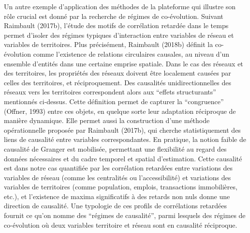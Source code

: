 \documentclass[10pt]{article}
\begin{document}
Un autre exemple d’application des méthodes de la plateforme qui illustre son rôle crucial est donné par la recherche de régimes de co-évolution. Suivant Raimbault (2017b), l'étude des motifs de corrélation retardée dans le temps permet d’isoler des régimes typiques d’interaction entre variables de réseau et variables de territoires. Plus précisément, Raimbault (2018b) définit la co-évolution comme l’existence de relations circulaires causales, au niveau d’un ensemble d’entités dans une certaine emprise spatiale. Dans le cas des réseaux et des territoires, les propriétés des réseaux doivent être localement causées par celles des territoires, et réciproquement. Des causalités unidirectionnelles des réseaux vers les territoires correspondent alors aux “effets structurants” mentionnés ci-dessus. Cette définition permet de capturer la “congruence” (Offner, 1993) entre ces objets, en quelque sorte leur adaptation réciproque de manière dynamique. Elle permet aussi la construction d’une méthode opérationnelle proposée par Raimbault (2017b), qui cherche statistiquement des liens de causalité entre variables correspondantes. En pratique, la notion faible de causalité de Granger est mobilisée, permettant une flexibilité au regard des données nécessaires et du cadre temporel et spatial d’estimation. Cette causalité est dans notre cas quantifiée par les corrélation retardées entre variations des variables de réseau (comme les centralités ou l'accessibilité) et variations des variables de territoires (comme population, emplois, transactions immobilières, etc.), et l’existence de maxima significatifs à des retards non nuls donne une direction de causalité. Une typologie de ces profils de corrélations retardées fournit ce qu’on nomme des “régimes de causalité”, parmi lesquels des régimes de co-évolution où deux variables territoire et réseau sont en causalité réciproque.
\end{document}
